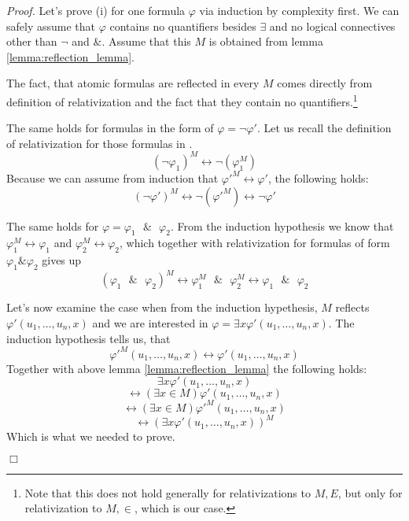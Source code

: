 \documentclass[12pt,a4paper]{article}
\newenvironment{proof}
{\noindent \textit{Proof.}}
{\hspace*{\fill} $\Box$}
\renewcommand{\iff}{\leftrightarrow}
\begin{document}
\begin{proof}
Let's prove (i) for one formula $\varphi$ via induction by complexity first. We can safely assume that $\varphi$ contains no quantifiers besides $\exists$ and no logical connectives other than $\neg$ and $\&$.
Assume that this $M$ is obtained from lemma \ref{lemma:reflection_lemma}.

The fact, that atomic formulas are reflected in every $M$ comes directly from definition of relativization and the fact that they contain no quantifiers.\footnote{Note that this does not hold generally for relativizations to $M, E$, but only for relativization to $M, \in$, which is our case.}

The same holds for formulas in the form of $\varphi = \neg \varphi'$. Let us recall the definition of relativization for those formulas in \label{def:relativization}.
\begin{equation}
(\neg \varphi_1)^M \iff \neg (\varphi_1^M)
\end{equation}
Because we can assume from induction that $\varphi'^M \iff \varphi'$, the following holds:
\begin{equation}
(\neg \varphi')^M \iff \neg (\varphi'^M) \iff \neg \varphi'
\end{equation}

The same holds for $\varphi = \varphi_1\mbox{ }\&\mbox{ }\varphi_2$. From the induction hypothesis we know that $\varphi_1^M \iff \varphi_1$ and $\varphi_2^M \iff \varphi_2$, which together with relativization for formulas of form $\varphi_1 \& \varphi_2$ gives up 
\begin{equation}
(\varphi_1\mbox{ }\&\mbox{ }\varphi_2)^M \iff \varphi_1^M\mbox{ }\&\mbox{ }\varphi_2^M \iff \varphi_1\mbox{ }\&\mbox{ }\varphi_2
\end{equation}


Let's now examine the case when from the induction hypethesis, $M$ reflects $\varphi'(u_1, \ldots, u_n, x)$ and we are interested in $\varphi = \exists x \varphi'(u_1, \ldots, u_n, x)$.
The induction hypothesis tells us, that 
\begin{equation}
\varphi'^M(u_1, \ldots, u_n, x) \iff \varphi'(u_1, \ldots, u_n, x)
\end{equation}
Together with above lemma \ref{lemma:reflection_lemma} the following holds:
\begin{equation}
\exists x \varphi'(u_1, \ldots, u_n, x)
\end{equation}
\begin{equation}
\iff (\exists x \in M) \varphi'(u_1, \ldots, u_n, x)
\end{equation}
\begin{equation}
\iff (\exists x \in M) \varphi'^M (u_1, \ldots, u_n, x) 
\end{equation}
\begin{equation}
\iff (\exists x \varphi'(u_1, \ldots, u_n, x))^M
\end{equation}
Which is what we needed to prove.


\end{proof}
\end{document}
